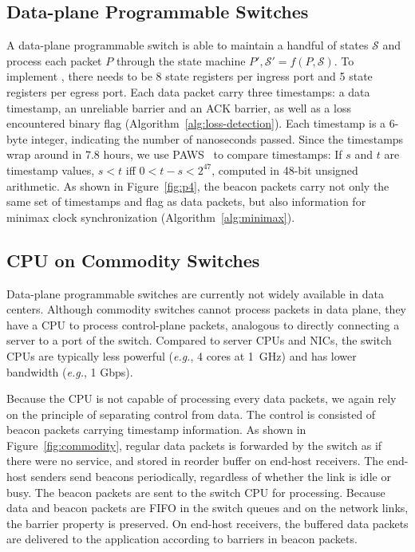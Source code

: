 \subsection{Data-plane Programmable Switches}
\label{sec:p4}

A data-plane programmable switch is able to maintain a handful of states $\mathcal{S}$ and process each packet $P$ through the state machine $P', \mathcal{S}' = f(P, \mathcal{S})$.
To implement \sys, there needs to be 8 state registers per ingress port and 5 state registers per egress port.
Each data packet carry three timestamps: a data timestamp, an unreliable barrier and an ACK barrier, as well as a loss encountered binary flag (Algorithm~\ref{alg:loss-detection}).
Each timestamp is a 6-byte integer, indicating the number of nanoseconds passed.
Since the timestamps wrap around in 7.8 hours, we use PAWS~\cite{jacobson1992tcp} to compare timestamps: If $s$ and $t$ are timestamp values, $s < t$ iff $0 < t - s < 2^{47}$, computed in 48-bit unsigned arithmetic.
As shown in Figure~\ref{fig:p4}, the beacon packets carry not only the same set of timestamps and flag as data packets, but also information for minimax clock synchronization (Algorithm~\ref{alg:minimax}).

\subsection{CPU on Commodity Switches}
\label{sec:commodity}

Data-plane programmable switches are currently not widely available in data centers.
Although commodity switches cannot process packets in data plane, they have a CPU to process control-plane packets, analogous to directly connecting a server to a port of the switch.
Compared to server CPUs and NICs, the switch CPUs are typically less powerful (\textit{e.g.}, 4 cores at 1~GHz) and has lower bandwidth (\textit{e.g.}, 1 Gbps).

Because the CPU is not capable of processing every data packets, we again rely on the principle of separating control from data.
The control is consisted of beacon packets carrying timestamp information.
As shown in Figure~\ref{fig:commodity}, regular data packets is forwarded by the switch as if there were no \sys service, and stored in reorder buffer on end-host receivers.
The end-host senders send beacons periodically, regardless of whether the link is idle or busy.
The beacon packets are sent to the switch CPU for processing.
Because data and beacon packets are FIFO in the switch queues and on the network links, the barrier property is preserved.
On end-host receivers, the buffered data packets are delivered to the application according to barriers in beacon packets.

